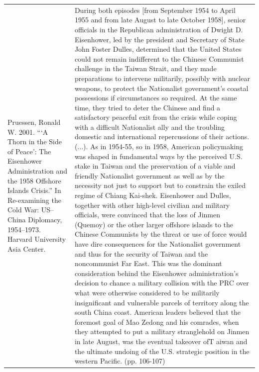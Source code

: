 {\begin{longtable}{p{}p{}}
Pruessen, Ronald W. 2001. “‘A Thorn in the Side of Peace’: The Eisenhower Administration and the 1958 Offshore Islands Crisis.” In Re-examining the Cold War: US–China Diplomacy, 1954–1973. Harvard University Asia Center. & During both episodes [from September 1954 to April 1955 and from late August to late October 1958], senior officials in the Republican administration of Dwight D. Eisenhower, led by the president and Secretary of State John Foster Dulles, determined that the United States could not remain indifferent to the Chinese Communist challenge in the Taiwan Strait, and they made preparations to intervene militarily, possibly with nuclear weapons, to protect the Nationalist government's coastal possessions if circumstances so required. At the same time, they tried to deter the Chinese and find a satisfactory peaceful exit from the crisis while coping with a difficult Nationalist ally and the troubling domestic and international repercussions of their actions. (...). As in 1954-55, so in 1958, American policymaking was shaped in fundamental ways by the perceived U.S. stake in Taiwan and the preservation of a viable and friendly Nationalist government as well as by the necessity not just to support but to constrain the exiled regime of Chiang Kai-shek. Eisenhower and Dulles, together with other high-level civilian and military officials, were convinced that the loss of Jinmen (Quemoy) or the other larger offshore islands to the Chinese Communists by the threat or use of force would have dire consequences for the Nationalist government and thus for the security of Taiwan and the noncommunist Far East. This was the dominant consideration behind the Eisenhower administration's decision to chance a military collision with the PRC over what were otherwise considered to be militarily insignificant and vulnerable parcels of territory along the south China coast. American leaders believed that the foremost goal of Mao Zedong and his comrades, when they attempted to put a military stranglehold on Jinmen in late August, was the eventual takeover ofT aiwan and the ultimate undoing of the U.S. strategic position in the western Pacific. (pp. 106-107)
\\

\end{longtable}}
